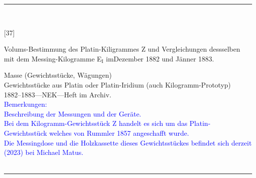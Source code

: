 \parbox{\textwidth}{%
\rule{\textwidth}{1pt}\vspace*{-3mm}\\
\begin{minipage}[t]{0.15\textwidth}\vspace{0pt}
\Huge\rule[-4mm]{0cm}{1cm}[37]
\end{minipage}
\hfill
\begin{minipage}[t]{0.85\textwidth}\vspace{0pt}
\large Volums-Bestimmung des Platin-Kiligrammes {\glqq}Z{\grqq} und Vergleichungen dessselben mit dem Messing-Kilogramme {\glqq}E$_\mathrm{I}${\grqq} imDezember 1882 und Jänner 1883.\rule[-2mm]{0mm}{2mm}
\end{minipage}
{\footnotesize\flushright
Masse (Gewichtsstücke, Wägungen)\\
Gewichtsstücke aus Platin oder Platin-Iridium (auch Kilogramm-Prototyp)\\
}
1882--1883\quad---\quad NEK\quad---\quad Heft im Archiv.\\
\textcolor{blue}{Bemerkungen:\\{}
Beschreibung der Messungen und der Geräte.\\{}
Bei dem Kilogramm-Gewichtsstück {\glqq}Z{\grqq} handelt es sich um das Platin-Gewichtsstück welches von Rummler 1857 angeschafft wurde.\\{}
Die Messingdose und die Holzkassette dieses Gewichtsstückes befindet sich derzeit (2023) bei Michael Matus.\\{}
}
\\[-15pt]
\rule{\textwidth}{1pt}
}
\\
\vspace*{-2.5pt}\\
